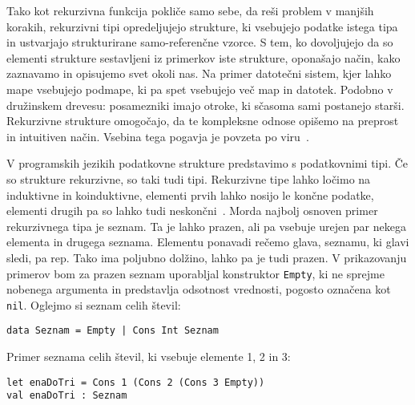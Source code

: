 \documentclass[12pt,a4paper,openany]{book}
\begin{document}
Tako kot rekurzivna funkcija pokliče samo sebe, da reši problem v manjših korakih, rekurzivni tipi opredeljujejo strukture, ki vsebujejo podatke istega tipa in ustvarjajo strukturirane 
samo-referenčne vzorce. S tem, ko dovoljujejo da so elementi strukture sestavljeni iz primerkov iste strukture, oponašajo način, kako zaznavamo in opisujemo svet okoli nas. 
Na primer datotečni sistem, kjer lahko mape vsebujejo podmape, ki pa spet vsebujejo več map in datotek. Podobno v družinskem drevesu: posamezniki imajo otroke, ki sčasoma sami 
postanejo starši. Rekurzivne strukture omogočajo, da te kompleksne odnose opišemo na preprost in intuitiven način. Vsebina tega pogavja je povzeta po viru~\cite{Pie02}.

V programskih jezikih podatkovne strukture predstavimo s podatkovnimi tipi. Če so strukture rekurzivne, so taki tudi tipi. Rekurzivne tipe lahko ločimo na induktivne in koinduktivne, elementi prvih lahko nosijo le končne podatke, elementi drugih pa so lahko tudi neskončni~\cite{Sla15}. Morda najbolj osnoven primer rekurzivnega tipa je seznam. Ta je lahko prazen, ali pa vsebuje urejen par nekega elementa in drugega seznama. Elementu ponavadi rečemo glava, seznamu, 
ki glavi sledi, pa rep. Tako ima poljubno dolžino, lahko pa je tudi prazen. V prikazovanju primerov bom za prazen seznam uporabljal konstruktor \lstinline{Empty}, ki ne sprejme nobenega argumenta in predstavlja odsotnost vrednosti, pogosto označena kot \lstinline{nil}. 
Oglejmo si seznam celih števil:
\begin{lstlisting}
data Seznam = Empty | Cons Int Seznam
\end{lstlisting}
Primer seznama celih števil, ki vsebuje elemente 1, 2 in 3:
\begin{lstlisting}
let enaDoTri = Cons 1 (Cons 2 (Cons 3 Empty))
val enaDoTri : Seznam
\end{lstlisting}
\end{document}
